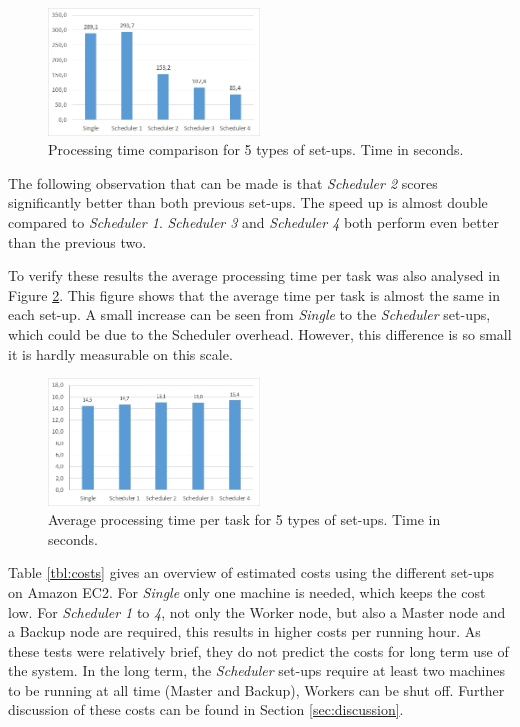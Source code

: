 \documentclass{acm_proc_article-sp}
\begin{document}
\begin{figure}
	\centering
	\includegraphics[width=0.5\textwidth]{images/diagram_total_processing.jpg}
	\caption{Processing time comparison for 5 types of set-ups. Time in seconds.}
	\label{fig:diagram_total_processing}
\end{figure}

The following observation that can be made is that \emph{Scheduler 2} scores significantly better than both previous set-ups.
The speed up is almost double compared to \emph{Scheduler 1}.
\emph{Scheduler 3} and \emph{Scheduler 4} both perform even better than the previous two.

To verify these results the average processing time per task was also analysed in Figure \ref{fig:diagram_avg_image}.
This figure shows that the average time per task is almost the same in each set-up.
A small increase can be seen from \emph{Single} to the \emph{Scheduler} set-ups, which could be due to the Scheduler overhead.
However, this difference is so small it is hardly measurable on this scale.

\begin{figure}
	\centering
	\includegraphics[width=0.5\textwidth]{images/diagram_avg_image.jpg}
	\caption{Average processing time per task for 5 types of set-ups. Time in seconds.}
	\label{fig:diagram_avg_image}
\end{figure}

Table \ref{tbl:costs} gives an overview of estimated costs using the different set-ups on Amazon EC2.
For \emph{Single} only one machine is needed, which keeps the cost low.
For \emph{Scheduler 1} to \emph{4}, not only the Worker node, but also a Master node and a Backup node are required, this results in higher costs per running hour.
As these tests were relatively brief, they do not predict the costs for long term use of the system.
In the long term, the \emph{Scheduler} set-ups require at least two machines to be running at all time (Master and Backup), Workers can be shut off.
Further discussion of these costs can be found in Section \ref{sec:discussion}.
\end{document}
